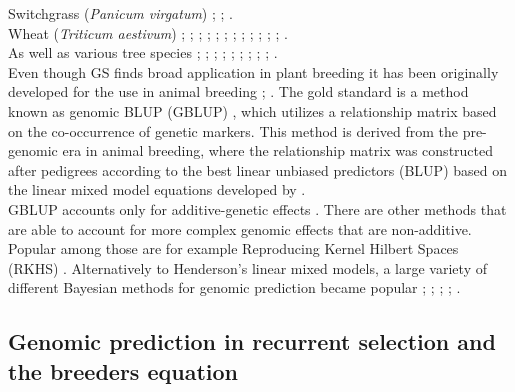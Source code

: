 Switchgrass (\textit{Panicum virgatum}) \cite{Ramstein_2016}; \cite{Poudel_2019}; \cite{Ramstein_2019}. \\
Wheat (\textit{Triticum aestivum}) \cite{Thavamanikumar_2015}; \cite{Lopez_Cruz_2015};
\cite{Sukumaran_2016}; \cite{Bustos_Korts_2016}; \cite{Gianola_2016_wheat};
\cite{Crossa_2016_wheat}; \cite{Rincent_2018}; \cite{Norman_2018}; \cite{Belamkar_2018};
\cite{Ovenden_2018}; \cite{Cuevas_2019}; \cite{Howard_2019}; \cite{Krause_2019}. \\
As well as various tree species \cite{Holliday_2012}; \cite{Resende_2012}; \cite{Zapata_Valenzuela_2013};  \cite{Jaramillo_Correa_2014}; \cite{Kumar_2015}; \cite{GamalElDien_2016}; \cite{Ratcliffe_2017}; \cite{Rincent_2018}; \cite{Kainer_2018}; \cite{deAlmeidaFilho2019}. \\
Even though GS finds broad application in plant breeding it has been originally developed
for the use in animal breeding \cite{hayes2010genome}; \cite{goddard2011using}. The gold
standard is a method known as genomic BLUP (GBLUP) \cite{vanraden2008efficient}, which utilizes a
relationship matrix based on the co-occurrence of genetic markers. This method is derived
from the pre-genomic era in animal breeding, where the relationship matrix was constructed
after pedigrees according to the best linear unbiased predictors (BLUP) based on the
linear mixed
model equations developed by \cite{henderson1975best}. \\
GBLUP accounts only for additive-genetic effects
\cite{vanraden2008efficient}. There are other methods that are able to account for more
complex genomic effects that are non-additive. Popular among those are for example
Reproducing Kernel Hilbert Spaces (RKHS) \cite{gianola2008reproducing}. Alternatively to
Henderson's linear mixed models, a large variety of different Bayesian methods for genomic
prediction became popular \cite{hayes2001}; \cite{gianola2009}; \cite{habier2011};
\cite{gianola2013}; \cite{crossa2017}.

\subsection{Genomic prediction in recurrent selection and the breeders equation}

